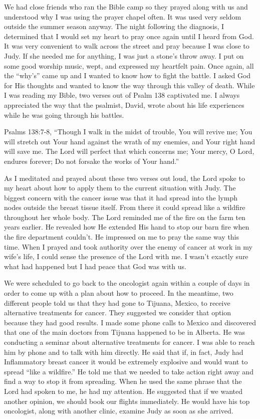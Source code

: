 \documentclass[oneside]{book}
\begin{document}
We had close friends who ran the Bible camp so they prayed along with us and understood why I was using the prayer chapel often. It was used very seldom outside the summer season anyway. The night following the diagnosis, I determined that I would set my heart to pray once again until I heard from God. It was very convenient to walk across the street and pray because I was close to Judy. If she needed me for anything, I was just a stone’s throw away. I put on some good worship music, wept, and expressed my heartfelt pain. Once again, all the “why’s” came up and I wanted to know how to fight the battle. I asked God for His thoughts and wanted to know the way through this valley of death. While I was reading my Bible, two verses out of Psalm 138 captivated me. I always appreciated the way that the psalmist, David, wrote about his life experiences while he was going through his battles.

Psalms 138:7-8, “Though I walk in the midst of trouble, You will revive me; You will stretch out Your hand against the wrath of my enemies, and Your right hand will save me. The Lord will perfect that which concerns me; Your mercy, O Lord, endures forever; Do not forsake the works of Your hand.”

As I meditated and prayed about these two verses out loud, the Lord spoke to my heart about how to apply them to the current situation with Judy. The biggest concern with the cancer issue was that it had spread into the lymph nodes outside the breast tissue itself. From there it could spread like a wildfire throughout her whole body. The Lord reminded me of the fire on the farm ten years earlier. He revealed how He extended His hand to stop our barn fire when the fire department couldn’t. He impressed on me to pray the same way this time. When I prayed and took authority over the enemy of cancer at work in my wife’s life, I could sense the presence of the Lord with me. I wasn’t exactly sure what had happened but I had peace that God was with us.

We were scheduled to go back to the oncologist again within a couple of days in order to come up with a plan about how to proceed. In the meantime, two different people told us that they had gone to Tijuana, Mexico, to receive alternative treatments for cancer. They suggested we consider that option because they had good results. I made some phone calls to Mexico and discovered that one of the main doctors from Tijuana happened to be in Alberta. He was conducting a seminar about alternative treatments for cancer. I was able to reach him by phone and to talk with him directly. He said that if, in fact, Judy had Inflammatory breast cancer it would be extremely explosive and would want to spread “like a wildfire.” He told me that we needed to take action right away and find a way to stop it from spreading. When he used the same phrase that the Lord had spoken to me, he had my attention. He suggested that if we wanted another opinion, we should book our flights immediately. He would have his top oncologist, along with another clinic, examine Judy as soon as she arrived. 
\end{document}

